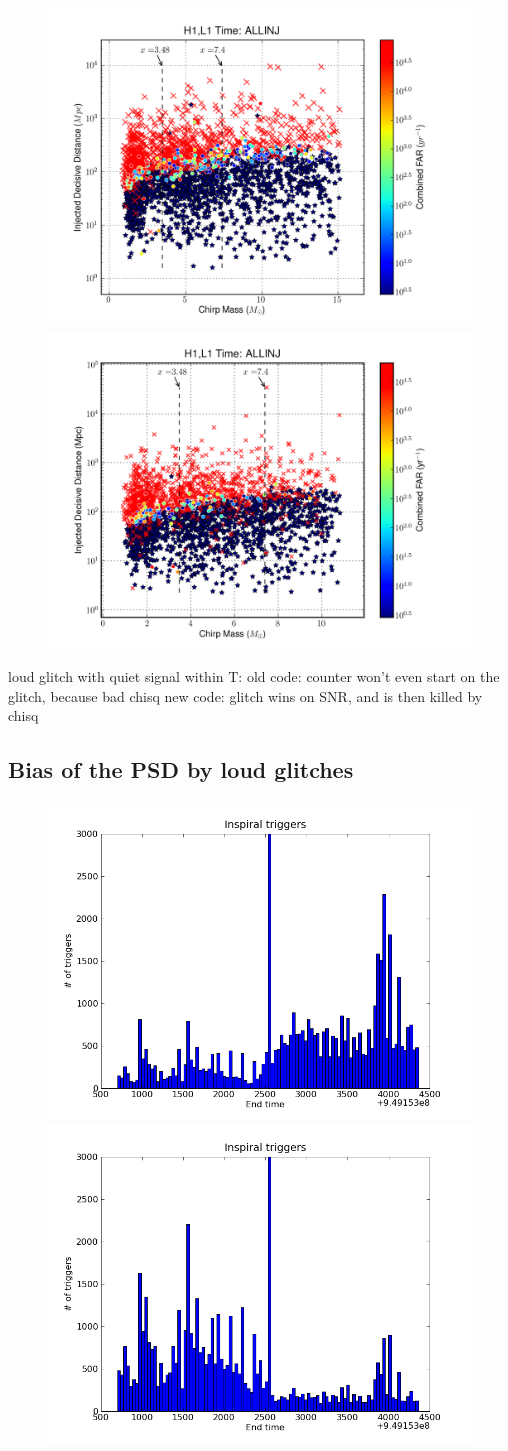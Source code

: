 \begin{figure}
  \includegraphics[width=0.5\linewidth]{figures/detchar/penguin_foundmissed_orig}
  \includegraphics[width=0.5\linewidth]{figures/detchar/penguin_foundmissed_new}
  \caption[] {
  \label{f:}
}
\end{figure}%

loud glitch with quiet signal within T:
  old code: counter won't even start on the glitch, because bad chisq
  new code: glitch wins on SNR, and is then killed by chisq



\subsection{Bias of the PSD by loud glitches}
\label{ssec:sarlacc}

\begin{figure}
  \includegraphics[width=0.5\linewidth]{figures/detchar/H1-endtime_hist_ORIG}
  \includegraphics[width=0.5\linewidth]{figures/detchar/H1-endtime_hist_RESEG}
  \caption[] {
  \label{f:}
}
\end{figure}%


